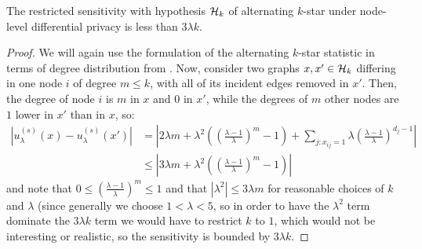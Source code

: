 \begin{claim}
The restricted sensitivity with hypothesis $\mathcal{H}_k$ of alternating $k$-star under node-level differential privacy is less than $3\lambda k$.
\end{claim}
\begin{proof}
We will again use the formulation of the alternating $k$-star statistic in terms of degree distribution from . Now, consider two graphs $x, x' \in \mathcal{H}_k$ differing in one node $i$ of degree $m \leq k$, with all of its incident edges removed in $x'$. Then, the degree of node $i$ is $m$ in $x$ and $0$ in $x'$, while the degrees of $m$ other nodes are $1$ lower in $x'$ than in $x$, so:
\begin{align*}
|u_\lambda^{(s)}(x) - u_\lambda^{(s)}(x')| & = \left|2\lambda m + \lambda^2\left( \left(\frac{\lambda - 1}{\lambda}\right)^m - 1\right) +\sum_{j: x_{ij} = 1} \lambda \left(\frac{\lambda - 1}{\lambda}\right)^{d_j - 1}  \right| \\
& \leq \left|3\lambda m +  \lambda^2\left( \left(\frac{\lambda - 1}{\lambda}\right)^m - 1\right)\right|
\end{align*}
and note that $0 \leq \left(\frac{\lambda - 1}{\lambda}\right)^m \leq 1$ and that $|\lambda^2| \leq 3\lambda m$ for reasonable choices of $k$ and $\lambda$ (since generally we choose $1 < \lambda < 5$, so in order to have the $\lambda^2$ term dominate the $3\lambda k$ term we would have to restrict $k$ to $1$, which would not be interesting or realistic, so the sensitivity is bounded by $3\lambda k$.
\end{proof}

